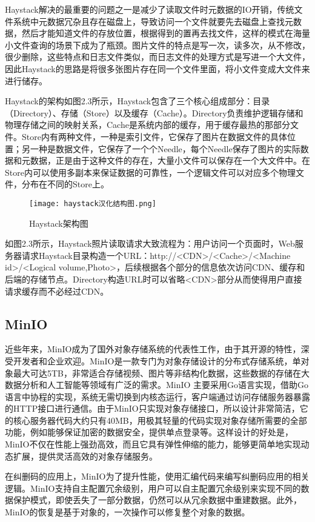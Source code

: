 Haystack解决的最重要的问题之一是减少了读取文件时元数据的IO开销，传统文件系统中元数据冗杂且存在磁盘上，导致访问一个文件就要先去磁盘上查找元数据，然后才能知道文件的存放位置，根据得到的置再去找文件，这样的模式在海量小文件查询的场景下成为了瓶颈。图片文件的特点是写一次，读多次，从不修改，很少删除，这些特点和日志文件类似，而日志文件的处理方式是写进一个大文件，因此Haystack的思路是将很多张图片存在同一个文件里面，将小文件变成大文件来进行储存。

Haystack的架构如图2.3所示，Haystack包含了三个核心组成部分：目录（Directory）、存储（Store）以及缓存（Cache）。Directory负责维护逻辑存储和物理存储之间的映射关系，Cache是系统内部的缓存，用于缓存最热的那部分文件。Store内有两种文件，一种是索引文件，它保存了图片在数据文件的具体位置；另一种是数据文件，它保存了一个个Needle，每个Needle保存了图片的实际数据和元数据，正是由于这种文件的存在，大量小文件可以保存在一个大文件中。在Store内可以使用多副本来保证数据的可靠性，一个逻辑文件可以对应多个物理文件，分布在不同的Store上。

\begin{figure}
    \centering
    \texttt{[image: haystack汉化结构图.png]}
    \caption{Haystack架构图}
\end{figure}

如图2.3所示，Haystack照片读取请求大致流程为：用户访问一个页面时，Web服务器请求Haystack目录构造一个URL：http://<CDN>/<Cache>/<Machine id>/<Logical volume,Photo>，后续根据各个部分的信息依次访问CDN、缓存和后端的存储节点。Directory构造URL时可以省略<CDN>部分从而使得用户直接请求缓存而不必经过CDN。

\subsection{MinIO}%
近些年来，MinIO成为了国外对象存储系统的代表性工作，由于其开源的特性，深受开发者和企业欢迎。MinIO是一款专门为对象存储设计的分布式存储系统，单对象最大可达5TB\cite{37}，非常适合存储视频、图片等非结构化数据，这些数据的存储在大数据分析和人工智能等领域有广泛的需求。MinIO 主要采用Go语言实现，借助Go语言中协程的实现，系统无需切换到内核态运行，客户端通过访问存储服务器暴露的HTTP接口进行通信。由于MinIO只实现对象存储接口，所以设计非常简洁，它的核心服务器代码大约只有40MB，用极其轻量的代码实现对象存储所需要的全部功能，例如能够保证加密的数据安全，提供单点登录等。这样设计的好处是，MinIO不仅在性能上强劲高效，而且它具有弹性伸缩的能力，能够更简单地实现动态扩展，提供灵活高效的对象存储服务。

在纠删码的应用上，MinIO为了提升性能，使用汇编代码来编写纠删码应用的相关逻辑。MinIO支持自主配置冗余级别，用户可以自主配置冗余级别来实现不同的数据保护模式，即使丢失了一部分数据，仍然可以从冗余数据中重建数据。此外，MinIO的恢复是基于对象的，一次操作可以修复整个对象的数据。

